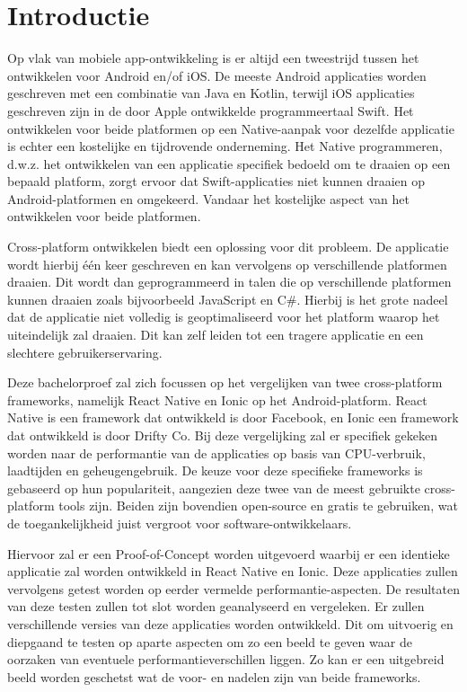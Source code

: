 
\section{Introductie}%
\label{sec:introductie}

Op vlak van mobiele app-ontwikkeling is er altijd een tweestrijd tussen het ontwikkelen voor Android en/of iOS. De meeste Android applicaties worden geschreven met een combinatie van Java en Kotlin, terwijl iOS applicaties geschreven zijn in de door Apple ontwikkelde programmeertaal Swift. Het ontwikkelen voor beide platformen op een Native-aanpak voor dezelfde applicatie is echter een kostelijke en tijdrovende onderneming. Het Native programmeren, d.w.z. het ontwikkelen van een applicatie specifiek bedoeld om te draaien op een bepaald platform, zorgt ervoor dat Swift-applicaties niet kunnen draaien op Android-platformen en omgekeerd. Vandaar het kostelijke aspect van het ontwikkelen voor beide platformen.

Cross-platform ontwikkelen biedt een oplossing voor dit probleem. De applicatie wordt hierbij één keer geschreven en kan vervolgens op verschillende platformen draaien. Dit wordt dan geprogrammeerd in talen die op verschillende platformen kunnen draaien zoals bijvoorbeeld JavaScript en C#. Hierbij is het grote nadeel dat de applicatie niet volledig is geoptimaliseerd voor het platform waarop het uiteindelijk zal draaien. Dit kan zelf leiden tot een tragere applicatie en een slechtere gebruikerservaring.

Deze bachelorproef zal zich focussen op het vergelijken van twee cross-platform frameworks, namelijk React Native en Ionic op het Android-platform. React Native is een framework dat ontwikkeld is door Facebook, en Ionic een framework dat ontwikkeld is door Drifty Co. Bij deze vergelijking zal er specifiek gekeken worden naar de performantie van de applicaties op basis van CPU-verbruik, laadtijden en geheugengebruik. De keuze voor deze specifieke frameworks is gebaseerd op hun populariteit, aangezien deze twee van de meest gebruikte cross-platform tools zijn. Beiden zijn bovendien open-source en gratis te gebruiken, wat de toegankelijkheid juist vergroot voor software-ontwikkelaars.

Hiervoor zal er een Proof-of-Concept worden uitgevoerd waarbij er een identieke applicatie zal worden ontwikkeld in React Native en Ionic. Deze applicaties zullen vervolgens getest worden op eerder vermelde performantie-aspecten. De resultaten van deze testen zullen tot slot worden geanalyseerd en vergeleken. Er zullen verschillende versies van deze applicaties worden ontwikkeld. Dit om uitvoerig en diepgaand te testen op aparte aspecten om zo een beeld te geven waar de oorzaken van eventuele performantieverschillen liggen. Zo kan er een uitgebreid beeld worden geschetst wat de voor- en nadelen zijn van beide frameworks.

